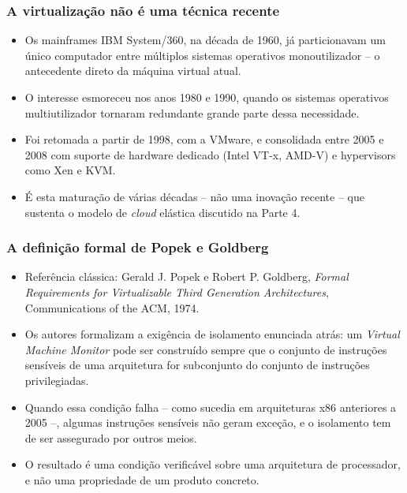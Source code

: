 \documentclass[aspectratio=169]{beamer}
\begin{document}
\begin{frame}
\frametitle{A virtualização não é uma técnica recente}
\begin{itemize}
    \setlength\itemsep{0.35cm}
    \item Os mainframes IBM System/360, na década de 1960, já particionavam um único computador entre múltiplos sistemas operativos monoutilizador -- o antecedente direto da máquina virtual atual.
    \item O interesse esmoreceu nos anos 1980 e 1990, quando os sistemas operativos multiutilizador tornaram redundante grande parte dessa necessidade.
    \item Foi retomada a partir de 1998, com a VMware, e consolidada entre 2005 e 2008 com suporte de hardware dedicado (Intel VT-x, AMD-V) e hypervisors como Xen e KVM.
    \item É esta maturação de várias décadas -- não uma inovação recente -- que sustenta o modelo de \emph{cloud} elástica discutido na Parte 4.
\end{itemize}
\end{frame}

\begin{frame}
\frametitle{A definição formal de Popek e Goldberg}
\begin{itemize}
    \setlength\itemsep{0.28cm}
    \item Referência clássica: Gerald J. Popek e Robert P. Goldberg, \emph{Formal Requirements for Virtualizable Third Generation Architectures}, Communications of the ACM, 1974.
    \item Os autores formalizam a exigência de isolamento enunciada atrás: um \emph{Virtual Machine Monitor} pode ser construído sempre que o conjunto de instruções sensíveis de uma arquitetura for subconjunto do conjunto de instruções privilegiadas.
    \item Quando essa condição falha -- como sucedia em arquiteturas x86 anteriores a 2005 --, algumas instruções sensíveis não geram exceção, e o isolamento tem de ser assegurado por outros meios.
    \item O resultado é uma condição verificável sobre uma arquitetura de processador, e não uma propriedade de um produto concreto.
\end{itemize}
\end{frame}
\end{document}
